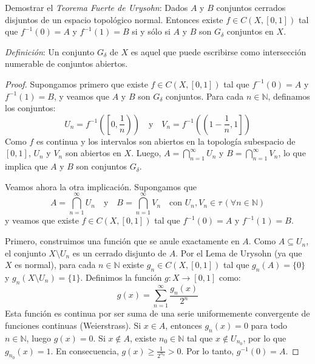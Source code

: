 \documentclass{article}
\theoremstyle{plain}
\theoremstyle{definition}
\newcommand{\N}{\mathbb{N}}
\newenvironment{ejercicio}[1]{\begin{trivlist}
\item[\hskip \labelsep {\bfseries Ejercicio}\hskip \labelsep {\bfseries #1.}]}{\end{trivlist}}
\begin{document}
\begin{ejercicio}{6}
    Demostrar el \emph{Teorema Fuerte de Urysohn}: Dados \( A \) y \( B \) conjuntos cerrados disjuntos de un espacio topológico normal. Entonces existe \( f \in C(X, [0,1]) \) tal que \( f^{-1}(0) = A \) y \( f^{-1}(1) = B \) si y sólo si \( A \) y \( B \) son \( G_\delta \) conjuntos en \( X \).

    \textit{Definición}: Un conjunto \( G_\delta \) de \( X \) es aquel que puede escribirse como intersección numerable de conjuntos abiertos.
\end{ejercicio}

\begin{proof}
    Supongamos primero que existe \( f \in C(X, [0, 1]) \) tal que \( f^{-1}(0) = A \) y \( f^{-1}(1) = B \), y veamos que \( A \) y \( B \) son \( G_\delta \) conjuntos. Para cada \( n \in \N \), definamos los conjuntos:
    \[
        U_n = f^{-1}\left( \left[ 0, \frac{1}{n} \right) \right) \quad \text{y} \quad V_n = f^{-1}\left( \left( 1 - \frac{1}{n}, 1 \right] \right)
    \]
    Como \( f \) es continua y los intervalos son abiertos en la topología subespacio de \( [0,1] \), \( U_n \) y \( V_n \) son abiertos en \( X \). Luego, \( A = \bigcap_{n=1}^{\infty} U_n \) y \( B = \bigcap_{n=1}^{\infty} V_n \), lo que implica que \( A \) y \( B \) son conjuntos \( G_\delta \).

    Veamos ahora la otra implicación. Supongamos que
    \[
        A = \bigcap_{n=1}^{\infty} U_n \quad \text{y} \quad B = \bigcap_{n=1}^{\infty} V_n \quad \text{con } U_n, V_n \in \tau \, (\forall n \in \N)
    \]
    y veamos que existe \( f \in C(X, [0, 1]) \) tal que \( f^{-1}(0) = A \) y \( f^{-1}(1) = B \).

    Primero, construimos una función que se anule exactamente en \( A \). Como \( A \subseteq U_n \), el conjunto \( X \setminus U_n \) es un cerrado disjunto de \( A \). Por el Lema de Urysohn (ya que \( X \) es normal), para cada \( n \in \N \) existe \( g_n \in C(X, [0, 1]) \) tal que \( g_n(A) = \{0\} \) y \( g_n(X \setminus U_n) = \{1\} \). Definimos la función \( g : X \to [0, 1] \) como:
    \[
        g(x) = \sum_{n=1}^{\infty} \frac{g_n(x)}{2^n}
    \]
    Esta función es continua por ser suma de una serie uniformemente convergente de funciones continuas (Weierstrass). Si \( x \in A \), entonces \( g_n(x) = 0 \) para todo \( n \in \N \), luego \( g(x) = 0 \). Si \( x \notin A \), existe \( n_0 \in \N \) tal que \( x \notin U_{n_0} \), por lo que \( g_{n_0}(x) = 1 \). En consecuencia, \( g(x) \geq \frac{1}{2^{n_0}} > 0 \). Por lo tanto, \( g^{-1}(0) = A \).


\end{proof}
\end{document}
